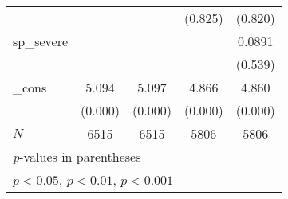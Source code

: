 {\begin{tabular}{l*{4}{c}}
            &                     &                     &     (0.825)         &     (0.820)         \\
[1em]
sp\_severe   &                     &                     &                     &      0.0891         \\
            &                     &                     &                     &     (0.539)         \\
[1em]
\_cons      &       5.094\sym{***}&       5.097\sym{***}&       4.866\sym{***}&       4.860\sym{***}\\
            &     (0.000)         &     (0.000)         &     (0.000)         &     (0.000)         \\
\hline
\(N\)       &        6515         &        6515         &        5806         &        5806         \\
\hline\hline
\multicolumn{5}{l}{\footnotesize \textit{p}-values in parentheses}\\
\multicolumn{5}{l}{\footnotesize \sym{*} \(p<0.05\), \sym{**} \(p<0.01\), \sym{***} \(p<0.001\)}\\
\end{tabular}
}
